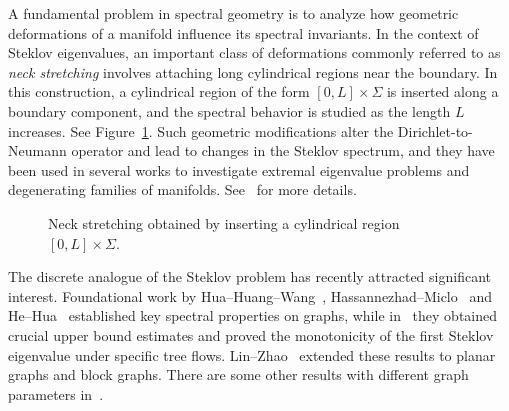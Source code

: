 \documentclass[11pt]{article}
\theoremstyle{definition}
\theoremstyle{remark}
\begin{document}
A fundamental problem in spectral geometry is to analyze how geometric deformations of a manifold influence its spectral invariants. In the context of Steklov eigenvalues, an important class of deformations commonly referred to as \emph{neck stretching} involves attaching long cylindrical regions near the boundary. In this construction, a cylindrical region of the form $[0,L]\times\Sigma$ is inserted along a boundary component, and the spectral behavior is studied as the length $L$ increases. See Figure~\ref{fig:neckstretch}. Such geometric modifications alter the Dirichlet-to-Neumann operator and lead to changes in the Steklov spectrum, and they have been used in several works to investigate extremal eigenvalue problems and degenerating families of manifolds. See~\cite{GirouardHenrotLagace2021,Thibault2024} for more details.

\begin{figure}[ht]\label{fig:neckstretch}
\centering
{}

\caption{Neck stretching obtained by inserting a cylindrical region
$[0,L]\times\Sigma$.}
\end{figure}

The discrete analogue of the Steklov problem has recently attracted significant interest. Foundational work by Hua--Huang--Wang~\cite{HuaHuangWang2017}, Hassannezhad--Miclo~\cite{HassannezhadMiclo2020} and
He--Hua~\cite{HeHua2022Upper} established key spectral properties on graphs, while in~\cite{HeHua2022Flows} they obtained crucial upper bound estimates and proved the monotonicity of the first Steklov eigenvalue under specific tree flows.
Lin--Zhao~\cite{LinZhaoPlanar} extended these results to planar graphs and block graphs. There are some other results with different graph parameters in~\cite{ChenShiZhang2025,LinLYZ2026, LinZhaoConnectivity,LinZhaoTrees,Perrin2019}.
\end{document}
